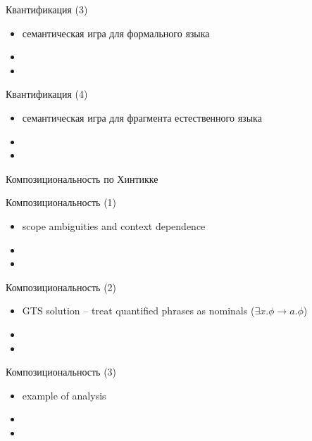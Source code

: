 \documentclass{beamer}
\begin{document}
\begin{frame}{Квантификация (3)}
\begin{itemize}
	\item семантическая игра для формального языка
	\item 
	\item 
\end{itemize}
\end{frame}

\begin{frame}{Квантификация (4)}
\begin{itemize}
	\item семантическая игра для фрагмента естественного языка
	\item 
	\item 
\end{itemize}
\end{frame}




\begin{frame}{}
\begin{center}
Композициональность по Хинтикке
\end{center}
\end{frame}

\begin{frame}{Композициональность (1)}
\begin{itemize}
	\item scope ambiguities and context dependence
	\item 
	\item 
\end{itemize}
\end{frame}

\begin{frame}{Композициональность (2)}
\begin{itemize}
	\item GTS solution -- treat quantified phrases as nominals ($\exists x . \phi \to a . \phi$)
	\item 
	\item 
\end{itemize}
\end{frame}

\begin{frame}{Композициональность (3)}
\begin{itemize}
	\item example of analysis
	\item 
	\item 
\end{itemize}
\end{frame}
\end{document}
